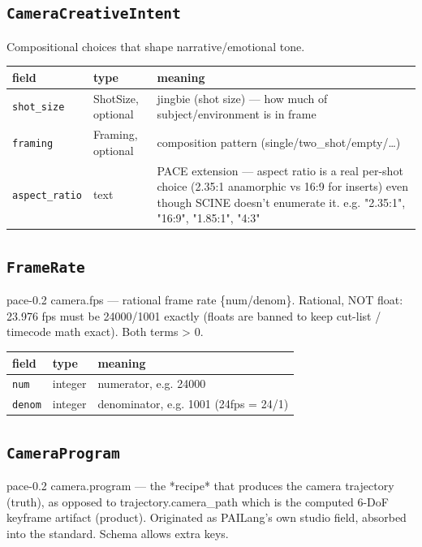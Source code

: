 \subsection*{\texttt{CameraCreativeIntent}}
\noindent Compositional choices that shape narrative/\allowbreak{}emotional tone.

\begin{longtable}{@{}R{0.24\textwidth}R{0.21\textwidth}R{0.49\textwidth}@{}}
\toprule \textbf{field} & \textbf{type} & \textbf{meaning} \\ \midrule
\endhead
\texttt{shot\_\allowbreak size} & ShotSize, optional & jingbie (shot size) ---\allowbreak{} how much of subject/\allowbreak{}environment is in frame \\
\texttt{framing} & Framing, optional & composition pattern (single/\allowbreak{}two\_\allowbreak shot/\allowbreak{}empty/\allowbreak{}\ldots{}) \\
\texttt{aspect\_\allowbreak ratio} & text & PACE extension ---\allowbreak{} aspect ratio is a real per-shot choice (2.35:1 anamorphic vs 16:9 for inserts) even though SCINE doesn't enumerate it. e.g. "2.35:1", "16:9", "1.85:1", "4:3" \\
\bottomrule
\end{longtable}

\subsection*{\texttt{FrameRate}}
\noindent pace-0.2 camera.fps ---\allowbreak{} rational frame rate \{num/\allowbreak{}denom\}. Rational, NOT float: 23.976 fps must be 24000/\allowbreak{}1001 exactly (floats are banned to keep cut-list /\allowbreak{} timecode math exact). Both terms > 0.

\begin{longtable}{@{}R{0.24\textwidth}R{0.21\textwidth}R{0.49\textwidth}@{}}
\toprule \textbf{field} & \textbf{type} & \textbf{meaning} \\ \midrule
\endhead
\texttt{num} & integer & numerator, e.g. 24000 \\
\texttt{denom} & integer & denominator, e.g. 1001 (24fps = 24/\allowbreak{}1) \\
\bottomrule
\end{longtable}

\subsection*{\texttt{CameraProgram}}
\noindent pace-0.2 camera.program ---\allowbreak{} the *recipe* that produces the camera trajectory (truth), as opposed to trajectory.camera\_\allowbreak path which is the computed 6-DoF keyframe artifact (product). Originated as PAILang's own studio field, absorbed into the standard. Schema allows extra keys.

